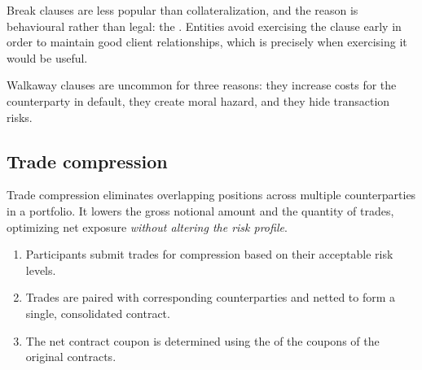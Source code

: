 \begin{crtrapbox}
Break clauses are less popular than collateralization, and the reason is
behavioural rather than legal: the . Entities avoid
exercising the clause early in order to maintain good client relationships,
which is precisely when exercising it would be useful.

\smallskip
Walkaway clauses are uncommon for three reasons: they increase costs for the
counterparty in default, they create moral hazard, and they hide transaction
risks.
\end{crtrapbox}

\subsection*{Trade compression}

Trade compression eliminates overlapping positions across multiple counterparties
in a portfolio. It lowers the gross notional amount and the quantity of trades,
optimizing net exposure \emph{without altering the risk profile}.

\begin{enumerate}
\item Participants submit trades for compression based on their acceptable risk
levels.
\item Trades are paired with corresponding counterparties and netted to form a
single, consolidated contract.
\item The net contract coupon is determined using the  of
the coupons of the original contracts.
\end{enumerate}


